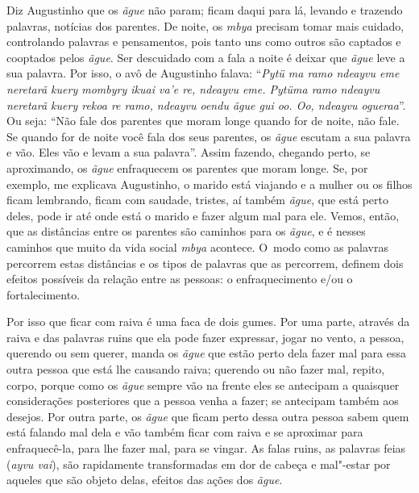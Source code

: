 Diz Augustinho que os \emph{ãgue} não param; ficam daqui para lá, levando e
trazendo palavras, notícias dos parentes. De noite, os \emph{mbya} precisam
tomar mais cuidado, controlando palavras e pensamentos, pois tanto uns
como outros são captados e cooptados pelos \emph{ãgue}. Ser descuidado com a
fala a noite é deixar que \emph{ãgue} leve a sua palavra. Por isso, o avô de
Augustinho falava: ``\emph{Pytü ma ramo ndeayvu eme neretarã kuery mombyry
ikuai va’e re, ndeayvu eme. Pytüma ramo ndeayvu neretarã kuery rekoa re
ramo, ndeayvu oendu ãgue gui oo. Oo, ndeayvu ogueraa}''. Ou seja: ``Não
fale dos parentes que moram longe quando for de noite, não fale. Se
quando for de noite você fala dos seus parentes, os \emph{ãgue} escutam a sua
palavra e vão. Eles vão e levam a sua palavra''. Assim fazendo, chegando
perto, se aproximando, os \emph{ãgue} enfraquecem os parentes que moram longe.
Se, por exemplo, me explicava Augustinho, o marido está viajando e a
mulher ou os filhos ficam lembrando, ficam com saudade, tristes, aí
também \emph{ãgue}, que está perto deles, pode ir até onde está o marido e fazer
algum mal para ele. Vemos, então, que as distâncias entre os parentes
são caminhos para os \emph{ãgue}, e é nesses caminhos que muito da vida social
\emph{mbya} acontece. O~modo como as palavras percorrem estas distâncias e
os tipos de palavras que as percorrem, definem dois efeitos possíveis
da relação entre as pessoas: o enfraquecimento e/ou o fortalecimento.

Por isso que ficar com raiva é uma faca de dois gumes. Por uma parte,
através da raiva e das palavras ruins que ela pode fazer expressar,
jogar no vento, a pessoa, querendo ou sem querer, manda os \emph{ãgue} que
estão perto dela fazer mal para essa outra pessoa que está lhe causando
raiva; querendo ou não fazer mal, repito, corpo, porque como os \emph{ãgue}
sempre vão na frente eles se antecipam a quaisquer considerações
posteriores que a pessoa venha a fazer; se antecipam também aos
desejos. Por outra parte, os \emph{ãgue} que ficam perto dessa outra pessoa
sabem quem está falando mal dela e vão também ficar com raiva e se
aproximar para enfraquecê-la, para lhe fazer mal, para se vingar. As
falas ruins, as palavras feias (\emph{ayvu vai}), são rapidamente
transformadas em dor de cabeça e mal"-estar por aqueles que são objeto
delas, efeitos das ações dos \emph{ãgue}.

